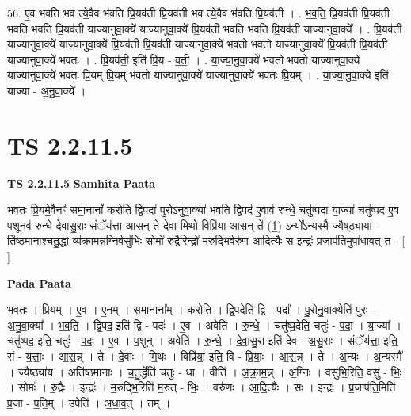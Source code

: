 \documentclass[17pt]{extarticle}
\begin{document}
56. ए॒व भ॑वति भव त्ये॒वैव भ॑वति प्रि॒यव॑ती प्रि॒यव॑ती भव त्ये॒वैव भ॑वति प्रि॒यव॑ती । . भ॒व॒ति॒ प्रि॒यव॑ती प्रि॒यव॑ती भवति भवति प्रि॒यव॑ती याज्यानुवा॒क्ये॑ याज्यानुवा॒क्ये᳚ प्रि॒यव॑ती भवति भवति प्रि॒यव॑ती याज्यानुवा॒क्ये᳚ । . प्रि॒यव॑ती याज्यानुवा॒क्ये॑ याज्यानुवा॒क्ये᳚ प्रि॒यव॑ती प्रि॒यव॑ती याज्यानुवा॒क्ये॑ भवतो भवतो याज्यानुवा॒क्ये᳚ प्रि॒यव॑ती प्रि॒यव॑ती याज्यानुवा॒क्ये॑ भवतः । . प्रि॒यव॑ती॒ इति॑ प्रि॒य - व॒ती॒ । . या॒ज्या॒नु॒वा॒क्ये॑ भवतो भवतो याज्यानुवा॒क्ये॑ याज्यानुवा॒क्ये॑ भवतः प्रि॒यम् प्रि॒यम् भ॑वतो याज्यानुवा॒क्ये॑ याज्यानुवा॒क्ये॑ भवतः प्रि॒यम् । . या॒ज्या॒नु॒वा॒क्ये॑ इति॑ याज्या - अ॒नु॒वा॒क्ये᳚ । \newline
\pagebreak
{}
\section*{ TS 2.2.11.5 }

\textbf{TS 2.2.11.5 } \newline
\textbf{Samhita Paata} \newline

भवतः प्रि॒यमे॒वैनꣳ॑ समा॒नानां᳚ करोति द्वि॒पदा॑ पुरोऽनुवा॒क्या॑ भवति द्वि॒पद॑ ए॒वाव॑ रुन्धे॒ चतु॑ष्पदा या॒ज्या॑ चतु॑ष्पद ए॒व प॒शूनव॑ रुन्धे देवासु॒राः संॅय॑त्ता आस॒न् ते दे॒वा मि॒थो विप्रि॑या आस॒न् ते᳚ (1॒) ऽन्यो᳚ऽन्यस्मै॒ ज्यैष्‌ठ्या॒या-ति॑ष्ठमानाश्चतु॒र्द्धा व्य॑क्रामन्न॒ग्निर्वसु॑भिः॒ सोमो॑ रु॒द्रैरिन्द्रो॑ म॒रुद्भि॒र्वरु॑ण आदि॒त्यैः स इन्द्रः॑ प्र॒जाप॑ति॒मुपा॑धाव॒त् त - [  ] \newline

\textbf{Pada Paata} \newline

भ॒व॒तः॒ । प्रि॒यम् । ए॒व । ए॒न॒म् । स॒मा॒नाना᳚म् । क॒रो॒ति॒ । द्वि॒पदेति॑ द्वि - पदा᳚ । पु॒रो॒नु॒वा॒क्येति॑ पुरः - अ॒नु॒वा॒क्या᳚ । भ॒व॒ति॒ । द्वि॒पद॒ इति॑ द्वि - पदः॑ । ए॒व । अवेति॑ । रु॒न्धे॒ । चतु॑ष्प॒देति॒ चतुः॑ - प॒दा॒ । या॒ज्या᳚ । चतु॑ष्पद॒ इति॒ चतुः॑ - प॒दः॒ । ए॒व । प॒शून् । अवेति॑ । रु॒न्धे॒ । दे॒वा॒सु॒रा इति॑ देव - अ॒सु॒राः । संॅय॑त्ता॒ इति॒ सं - य॒त्ताः॒ । आ॒स॒न्न् । ते । दे॒वाः । मि॒थः । विप्रि॑या॒ इति॒ वि - प्रि॒याः॒ । आ॒स॒न्न् । ते । अ॒न्यः । अ॒न्यस्मै᳚ । ज्यैष्ठ्या॑य । अति॑ष्ठमानाः । च॒तु॒र्द्धेति॑ चतुः - धा । वीति॑ । अ॒क्रा॒म॒न्न् । अ॒ग्निः । वसु॑भि॒रिति॒ वसु॑ - भिः॒ । सोमः॑ । रु॒द्रैः । इन्द्रः॑ । म॒रुद्भि॒रिति॑ म॒रुत् - भिः॒ । वरु॑णः । आ॒दि॒त्यैः । सः । इन्द्रः॑ । प्र॒जाप॑ति॒मिति॑ प्र॒जा - प॒ति॒म् । उपेति॑ । अ॒धा॒व॒त् । तम् ।  \newline
\end{document}
